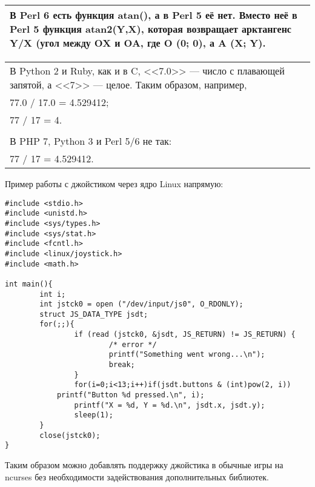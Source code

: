 \documentclass[14pt,openany]{book}
\begin{document}
\begin{center}
\begin{tabular}{|p{\textwidth}|}
\hline
\end{tabular}
\begin{tabular}{|p{\textwidth}|}
\hline
В Perl 6 есть функция atan(), а в Perl 5 её нет. Вместо неё в Perl 5 функция atan2(Y,X), которая возвращает арктангенс Y/X (угол между OX и OA, где O (0; 0), а A (X; Y). \\
\hline
\end{tabular}
\begin{tabular}{|p{\textwidth}|}
\hline
В Python 2 и Ruby, как и в C, <<7.0>> --- число с плавающей запятой, а <<7>> --- целое. Таким образом, например, \\
77.0 / 17.0 = 4.529412; \\
77 / 17 = 4. \\
 \\
В PHP 7, Python 3 и Perl 5/6 не так: \\
77 / 17 = 4.529412. \\
\hline
\end{tabular}
\end{center}
Пример работы с джойстиком через ядро Linux напрямую:\\
\begin{lstlisting}
#include <stdio.h>
#include <unistd.h>
#include <sys/types.h>
#include <sys/stat.h>
#include <fcntl.h>
#include <linux/joystick.h>
#include <math.h>

int main(){
        int i;
        int jstck0 = open ("/dev/input/js0", O_RDONLY);
        struct JS_DATA_TYPE jsdt;
        for(;;){
                if (read (jstck0, &jsdt, JS_RETURN) != JS_RETURN) {
                        /* error */
                        printf("Something went wrong...\n");
                        break;
                }
                for(i=0;i<13;i++)if(jsdt.buttons & (int)pow(2, i))
			printf("Button %d pressed.\n", i);
                printf("X = %d, Y = %d.\n", jsdt.x, jsdt.y);
                sleep(1);
        }
        close(jstck0);
}
\end{lstlisting}
Таким образом можно добавлять поддержку джойстика в обычные игры на ncurses без необходимости задействования дополнительных библиотек.
\end{document}
